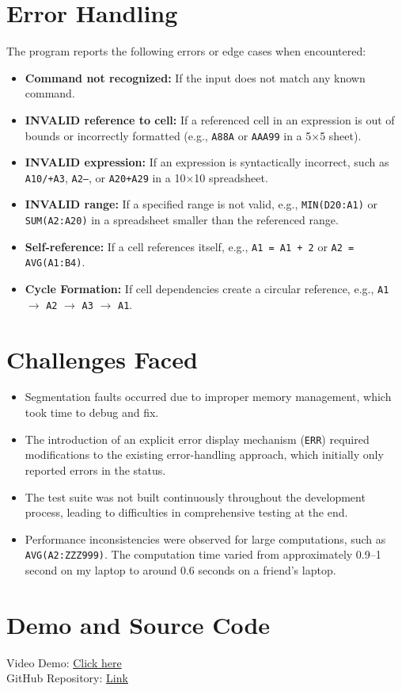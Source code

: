 \documentclass{article}
\begin{document}
\section{Error Handling}
The program reports the following errors or edge cases when encountered:
\begin{itemize}
    \item \textbf{Command not recognized:} If the input does not match any known command.
    \item \textbf{INVALID reference to cell:} If a referenced cell in an expression is out of bounds or incorrectly formatted (e.g., \texttt{A88A} or \texttt{AAA99} in a 5×5 sheet).
    \item \textbf{INVALID expression:} If an expression is syntactically incorrect, such as \texttt{A10/+A3}, \texttt{A2--}, or \texttt{A20+A29} in a 10×10 spreadsheet.
    \item \textbf{INVALID range:} If a specified range is not valid, e.g., \texttt{MIN(D20:A1)} or \texttt{SUM(A2:A20)} in a spreadsheet smaller than the referenced range.
    \item \textbf{Self-reference:} If a cell references itself, e.g., \texttt{A1 = A1 + 2} or \texttt{A2 = AVG(A1:B4)}.
    \item \textbf{Cycle Formation:} If cell dependencies create a circular reference, e.g., \texttt{A1} $\rightarrow$ \texttt{A2} $\rightarrow$ \texttt{A3} $\rightarrow$ \texttt{A1}.
\end{itemize}

\section{Challenges Faced}
\begin{itemize}
    \item Segmentation faults occurred due to improper memory management, which took time to debug and fix.
    \item The introduction of an explicit error display mechanism (\texttt{ERR}) required modifications to the existing error-handling approach, which initially only reported errors in the status.
    \item The test suite was not built continuously throughout the development process, leading to difficulties in comprehensive testing at the end.
    \item Performance inconsistencies were observed for large computations, such as \texttt{AVG(A2:ZZZ999)}. The computation time varied from approximately 0.9–1 second on my laptop to around 0.6 seconds on a friend's laptop.
\end{itemize}

\section{Demo and Source Code}
Video Demo: \href{https://drive.google.com/drive/folders/1JQE8CMu1abhWop8P4bJsiEpsB6zOg36A?usp=sharing}{Click here}\\
GitHub Repository: \href{https://github.com/dheeraj-hj/Spreadsheet-Program-in-C}{Link}
\end{document}
